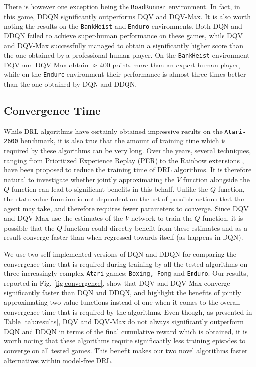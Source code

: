 There is however one exception being the \texttt{RoadRunner} environment. In fact, in this game, DDQN significantly outperforms DQV and DQV-Max. It is also worth noting the results on the \texttt{BankHeist} and \texttt{Enduro} environments. Both DQN and DDQN failed to achieve super-human performance on these games, while DQV and DQV-Max successfully managed to obtain a significantly higher score than the one obtained by a professional human player. On the \texttt{BankHeist} environment DQV and DQV-Max obtain $\approx 400$ points more than an expert human player, while on the \texttt{Enduro} environment their performance is almost three times better than the one obtained by DQN and DDQN.




\subsection{Convergence Time}
\label{sec:convergence_time}

While DRL algorithms have certainly obtained impressive results on the \texttt{Atari-2600} benchmark, it is also true that the amount of training time which is required by these algorithms can be very long. Over the years, several techniques, ranging from Prioritized Experience Replay (PER) \cite{wang2016dueling} to the Rainbow extensions \cite{hessel2018rainbow}, have been proposed to reduce the training time of DRL algorithms. It is therefore natural to investigate whether jointly approximating the $V$ function alongside the $Q$ function can lead to significant benefits in this behalf. Unlike the $Q$ function, the state-value function is not dependent on the set of possible actions that the agent may take, and therefore requires fewer parameters to converge. Since DQV and DQV-Max use the estimates of the $V$ network to train the $Q$ function, it is possible that the $Q$ function could directly benefit from these estimates and as a result converge faster than when regressed towards itself (as happens in DQN).

We use two self-implemented versions of DQN and DDQN for comparing the convergence time that is required during training by all the tested algorithms on three increasingly complex \texttt{Atari} games: \texttt{Boxing, Pong} and \texttt{Enduro}. Our results, reported in Fig. \ref{fig:convergence}, show that DQV and DQV-Max converge significantly faster than DQN and DDQN, and highlight the benefits of jointly approximating two value functions instead of one when it comes to the overall convergence time that is required by the algorithms. Even though, as presented in Table \ref{tab:results}, DQV and DQV-Max do not always significantly outperform DQN and DDQN in terms of the final cumulative reward which is obtained, it is worth noting that these algorithms require significantly less training episodes to converge on all tested games. This benefit makes our two novel algorithms faster alternatives within model-free DRL.

